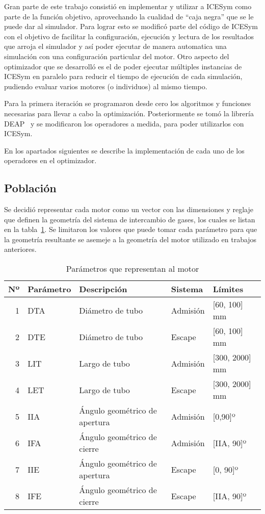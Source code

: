 %
%
Gran parte de este trabajo consistió en implementar y utilizar a ICESym como
parte de la función objetivo, aprovechando la cualidad de ``caja negra'' que se
le puede dar al simulador.
%
Para lograr esto se modificó parte del código de ICESym con el objetivo de
facilitar la configuración, ejecución y lectura de los resultados que arroja el
simulador y así poder ejecutar de manera automatica una simulación con una
configuración particular del motor.
%
Otro aspecto del optimizador que se desarrolló es el de poder ejecutar múltiples
instancias de ICESym en paralelo para reducir el tiempo de ejecución de cada
simulación, pudiendo evaluar varios motores (o individuos) al mismo tiempo.

Para la primera iteración se programaron desde cero los algoritmos y funciones
necesarias para llevar a cabo la optimización.
%
Posteriormente se tomó la librería DEAP~\parencite{DEAP_JMLR2012} y se
modificaron los operadores a medida, para poder utilizarlos con ICESym.

En los apartados siguientes se describe la implementación de cada uno de los
operadores en el optimizador.

\subsection{Población}
%
Se decidió representar cada motor como un vector con las dimensiones y reglaje
que definen la geometría del sistema de intercambio de gases, los cuales se
listan en la tabla~\ref{tab:param_motor}.
%
Se limitaron los valores que puede tomar cada parámetro para que la geometría
resultante se asemeje a la geometría del motor utilizado en trabajos anteriores.


\begin{table}[ht]
  \centering
  \begin{tabular}{rllll} \toprule
    Nº & Parámetro & Descripción & Sistema & Límites \\ \midrule
    1 & DTA & Diámetro de tubo & Admisión & [60, 100] mm \\
    2 & DTE & Diámetro de tubo & Escape & [60, 100] mm\\
    3 & LIT & Largo de tubo & Admisión & [300, 2000] mm\\
    4 & LET & Largo de tubo & Escape & [300, 2000] mm\\
    5 & IIA & Ángulo geométrico de apertura & Admisión & [0,90]º \\
    6 & IFA & Ángulo geométrico de cierre & Admisión & [IIA, 90]º \\
    7 & IIE & Ángulo geométrico de apertura & Escape & [0, 90]º \\
    8 & IFE & Ángulo geométrico de cierre & Escape & [IIA, 90]º \\ \bottomrule
  \end{tabular}
  \caption{Parámetros que representan al motor}\label{tab:param_motor}
\end{table}


